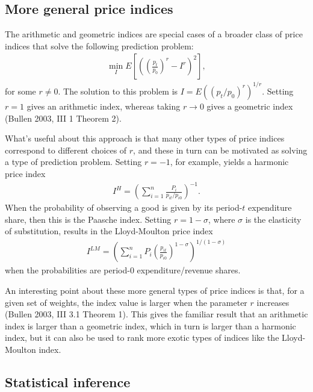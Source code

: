 \documentclass[]{article}
\begin{document}
\hypertarget{more-general-price-indices}{%
\subsection{More general price indices}\label{more-general-price-indices}}

The arithmetic and geometric indices are special cases of a broader class of price indices that solve the following prediction problem:
\begin{align*}
\min_{I} E\left[\left(\left(\frac{p_{t}}{p_{0}}\right)^{r} - I^{r} \right)^{2}\right],
\end{align*}
for some \(r \neq 0\). The solution to this problem is \(I = E((p_{t} / p_{0})^{r})^{1 / r}\). Setting \(r = 1\) gives an arithmetic index, whereas taking \(r \rightarrow 0\) gives a geometric index (Bullen 2003, III 1 Theorem 2).

What's useful about this approach is that many other types of price indices correspond to different choices of \(r\), and these in turn can be motivated as solving a type of prediction problem. Setting \(r = -1\), for example, yields a harmonic price index
\begin{align*}
I^{H} = \left(\sum_{i = 1}^{n} \frac{P_{i}}{p_{it} / p_{i0}} \right)^{-1}.
\end{align*}
When the probability of observing a good is given by its period-\(t\) expenditure share, then this is the Paasche index. Setting \(r = 1 - \sigma\), where \(\sigma\) is the elasticity of substitution, results in the Lloyd-Moulton price index
\begin{align*}
I^{LM} = \left(\sum_{i = 1}^{n} P_{i} \left(\frac{p_{it}}{p_{i0}}\right)^{1 - \sigma}\right)^{1 / (1 - \sigma)}
\end{align*}
when the probabilities are period-0 expenditure/revenue shares.

An interesting point about these more general types of price indices is that, for a given set of weights, the index value is larger when the parameter \(r\) increases (Bullen 2003, III 3.1 Theorem 1). This gives the familiar result that an arithmetic index is larger than a geometric index, which in turn is larger than a harmonic index, but it can also be used to rank more exotic types of indices like the Lloyd-Moulton index.

\hypertarget{statistical-inference}{%
\subsection{Statistical inference}\label{statistical-inference}}
\end{document}
